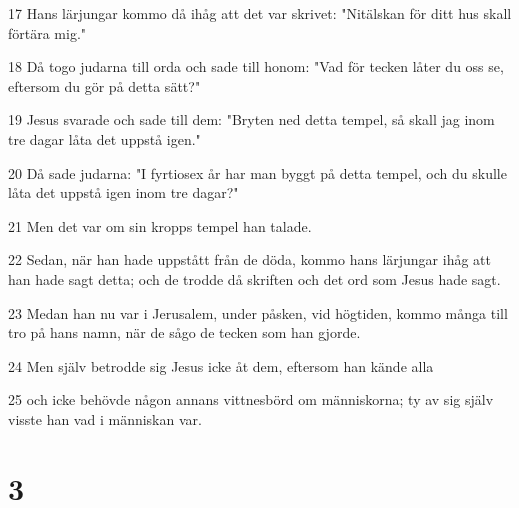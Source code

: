 \par 17 Hans lärjungar kommo då ihåg att det var skrivet: "Nitälskan för ditt hus skall förtära mig."
\par 18 Då togo judarna till orda och sade till honom: "Vad för tecken låter du oss se, eftersom du gör på detta sätt?"
\par 19 Jesus svarade och sade till dem: "Bryten ned detta tempel, så skall jag inom tre dagar låta det uppstå igen."
\par 20 Då sade judarna: "I fyrtiosex år har man byggt på detta tempel, och du skulle låta det uppstå igen inom tre dagar?"
\par 21 Men det var om sin kropps tempel han talade.
\par 22 Sedan, när han hade uppstått från de döda, kommo hans lärjungar ihåg att han hade sagt detta; och de trodde då skriften och det ord som Jesus hade sagt.
\par 23 Medan han nu var i Jerusalem, under påsken, vid högtiden, kommo många till tro på hans namn, när de sågo de tecken som han gjorde.
\par 24 Men själv betrodde sig Jesus icke åt dem, eftersom han kände alla
\par 25 och icke behövde någon annans vittnesbörd om människorna; ty av sig själv visste han vad i människan var.

\chapter{3}

